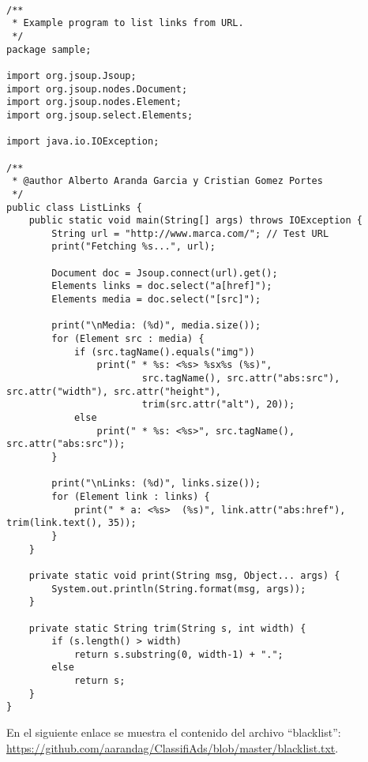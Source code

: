 \documentclass{pre-tfg}
\begin{document}
\begin{lstlisting}[caption=Ejemplo de código de recuperación de links de una URL,style=java]

/**
 * Example program to list links from URL. 
 */
package sample;

import org.jsoup.Jsoup;
import org.jsoup.nodes.Document;
import org.jsoup.nodes.Element;
import org.jsoup.select.Elements;

import java.io.IOException;

/**
 * @author Alberto Aranda Garcia y Cristian Gomez Portes
 */
public class ListLinks {
    public static void main(String[] args) throws IOException {
        String url = "http://www.marca.com/"; // Test URL
        print("Fetching %s...", url);

        Document doc = Jsoup.connect(url).get();
        Elements links = doc.select("a[href]");
        Elements media = doc.select("[src]");

        print("\nMedia: (%d)", media.size());
        for (Element src : media) {
            if (src.tagName().equals("img"))
                print(" * %s: <%s> %sx%s (%s)",
                        src.tagName(), src.attr("abs:src"), src.attr("width"), src.attr("height"),
                        trim(src.attr("alt"), 20));
            else
                print(" * %s: <%s>", src.tagName(), src.attr("abs:src"));
        }

        print("\nLinks: (%d)", links.size());
        for (Element link : links) {
            print(" * a: <%s>  (%s)", link.attr("abs:href"), trim(link.text(), 35));
        }
    }

    private static void print(String msg, Object... args) {
        System.out.println(String.format(msg, args));
    }

    private static String trim(String s, int width) {
        if (s.length() > width)
            return s.substring(0, width-1) + ".";
        else
            return s;
    }
}

\end{lstlisting}

En el siguiente enlace se muestra el contenido del archivo ``blacklist'': \url{https://github.com/aarandag/ClassifiAds/blob/master/blacklist.txt}.

\newpage


\singlespacing

\end{document}
